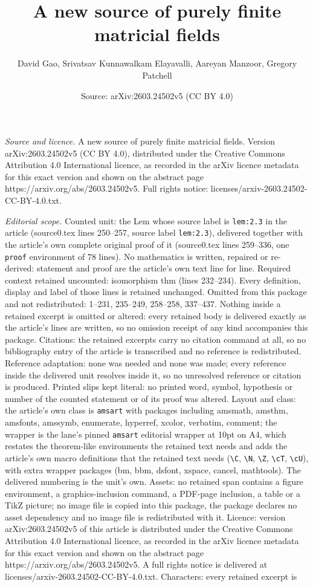 \documentclass[10pt,a4paper]{amsart}
\title[A new source of purely finite matricial fields]{A new source of purely finite matricial fields}
\author{David Gao, Srivatsav Kunnawalkam Elayavalli, Aareyan Manzoor, Gregory Patchell}
\date{Source: arXiv:2603.24502v5 (CC BY 4.0)}
\begin{document}
\maketitle

\noindent\emph{Source and licence.} A new source of purely finite matricial fields. Version arXiv:2603.24502v5 (CC BY 4.0), distributed under the Creative Commons Attribution 4.0 International licence, as recorded in the arXiv licence metadata for this exact version and shown on the abstract page https://arxiv.org/abs/2603.24502v5. Full rights notice: licenses/arxiv-2603.24502-CC-BY-4.0.txt.\par\smallskip

\noindent\textit{Editorial scope.} Counted unit: the Lem whose source label is \texttt{lem:2.3} in the article (source0.tex lines 250--257, source label \texttt{lem:2.3}), delivered together with the article's own complete original proof of it (source0.tex lines 259--336, one \texttt{proof} environment of 78 lines). No mathematics is written, repaired or re-derived: statement and proof are the article's own text line for line. Required context retained uncounted: isomorphism thm (lines 232--234). Every definition, display and label of those lines is retained unchanged. Omitted from this package and not redistributed: 1--231, 235--249, 258--258, 337--437. Nothing inside a retained excerpt is omitted or altered: every retained body is delivered exactly as the article's lines are written, so no omission receipt of any kind accompanies this package. Citations: the retained excerpts carry no citation command at all, so no bibliography entry of the article is transcribed and no reference is redistributed. Reference adaptation: none was needed and none was made; every reference inside the delivered unit resolves inside it, so no unresolved reference or citation is produced. Printed slips kept literal: no printed word, symbol, hypothesis or number of the counted statement or of its proof was altered. Layout and class: the article's own class is \texttt{amsart} with packages including amsmath, amsthm, amsfonts, amssymb, enumerate, hyperref, xcolor, verbatim, comment; the wrapper is the lane's pinned \texttt{amsart} editorial wrapper at 10pt on A4, which restates the theorem-like environments the retained text needs and adds the article's own macro definitions that the retained text needs (\texttt{\textbackslash C}, \texttt{\textbackslash N}, \texttt{\textbackslash Z}, \texttt{\textbackslash cT}, \texttt{\textbackslash cU}), with extra wrapper packages (bm, bbm, dsfont, xspace, cancel, mathtools). The delivered numbering is the unit's own. Assets: no retained span contains a figure environment, a graphics-inclusion command, a PDF-page inclusion, a table or a TikZ picture; no image file is copied into this package, the package declares no asset dependency and no image file is redistributed with it. Licence: version arXiv:2603.24502v5 of this article is distributed under the Creative Commons Attribution 4.0 International licence, as recorded in the arXiv licence metadata for this exact version and shown on the abstract page https://arxiv.org/abs/2603.24502v5. A full rights notice is delivered at licenses/arxiv-2603.24502-CC-BY-4.0.txt. Characters: every retained excerpt is 
\end{document}
